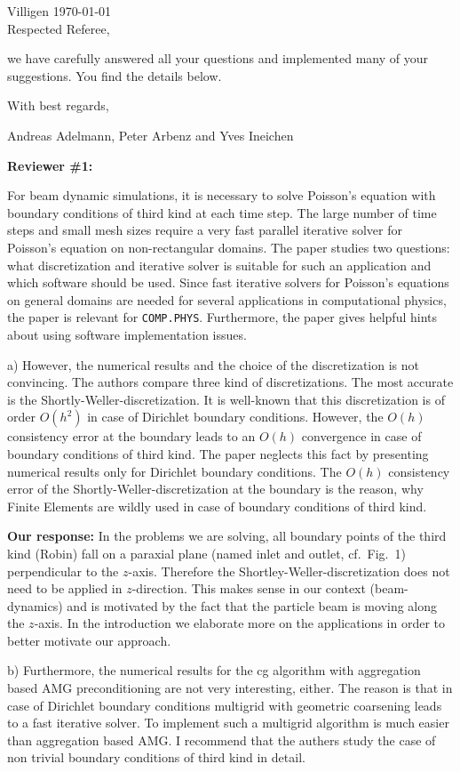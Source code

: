 \documentclass[10pt,pdftex]{report}
\begin{document}
Villigen \today \\
 
Respected Referee,
 
we have carefully answered all your questions and implemented many of
your suggestions.  You find the details below.
 
With best regards,

Andreas Adelmann, Peter Arbenz and Yves Ineichen

{\bf Reviewer \#1:}

For beam dynamic simulations, it is necessary to solve Poisson's
equation with boundary conditions of third kind at each time step.  The
large number of time steps and small mesh sizes require a very fast
parallel iterative solver for Poisson's equation on non-rectangular
domains. The paper studies two questions: what discretization and
iterative solver is suitable for such an application and which software
should be used. Since fast iterative solvers for Poisson's equations on
general domains are needed for several applications in computational
physics, the paper is relevant for \texttt{COMP.PHYS}. Furthermore, the
paper gives helpful hints about using software implementation issues.

a) However, the numerical results and the choice of the discretization
is not convincing.  The authors compare three kind of discretizations.
The most accurate is the Shortly-Weller-discretization. It is well-known
that this discretization is of order $O(h^2)$ in case of Dirichlet
boundary conditions.  However, the $O(h)$ consistency error at the
boundary leads to an $O(h)$ convergence in case of boundary conditions
of third kind.  The paper neglects this fact by presenting numerical
results only for Dirichlet boundary conditions. The $O(h)$ consistency
error of the Shortly-Weller-discretization at the boundary is the
reason, why Finite Elements are wildly used in case of boundary
conditions of third kind.

{\textbf{Our response:}} In the problems we are solving, all boundary
points of the third kind (Robin) fall on a paraxial plane (named inlet and
outlet, cf.~Fig.~1) perpendicular to the $z$-axis.  Therefore the
Shortley-Weller-discretization does not need to be applied in
$z$-direction.  This makes sense in our context (beam-dynamics) and is
motivated by the fact that the particle beam is moving along the $z$-axis.
In the introduction we elaborate more on the applications in order to
better motivate our approach.


b) Furthermore, the numerical results for the cg algorithm with aggregation
based AMG preconditioning are not very interesting, either. The reason is that
in case of Dirichlet boundary conditions multigrid with geometric coarsening
leads to a fast iterative solver.  To implement such a multigrid algorithm is
much easier than aggregation based AMG. I recommend that the authers study the
case of non trivial boundary conditions of third kind in detail. 
\end{document}
